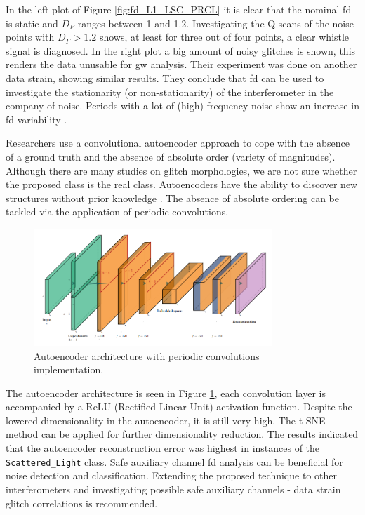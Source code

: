 In the left plot of Figure \ref{fig:fd_L1_LSC_PRCL} it is clear that the nominal \acrshort{fd} is static and $D_{F}$ ranges between 1 and 1.2. Investigating the Q-scans of the noise points with $D_{F} > 1.2$ shows, at least for three out of four points, a clear whistle signal is diagnosed. In the right plot a big amount of noisy glitches is shown, this renders the data unusable for \acrshort{gw} analysis. Their experiment was done on another data strain, showing similar results. They conclude that \acrshort{fd} can be used to investigate the stationarity (or non-stationarity) of the interferometer in the company of noise.  Periods with a lot of (high) frequency noise show an increase in \acrshort{fd} variability \citep{cavaglia2022characterization}.

Researchers \citep{laguarta2023detection} use a convolutional autoencoder approach to cope with the absence of a ground truth and the absence of absolute order (variety of magnitudes). Although there are many studies on glitch morphologies, we are not sure whether the proposed class is the real class. Autoencoders have the ability to discover new structures without prior knowledge \citep{bank2023autoencoders}. The absence of absolute ordering can be tackled via the application of periodic convolutions. 
\begin{figure}
    \centering
    \includegraphics[width=0.8\textwidth]{Images/autoencoder_periodic_convolution.png}
    \caption{Autoencoder architecture with periodic convolutions implementation. \citep{laguarta2023detection}}
    \label{fig:autoencoder_laguarta}
\end{figure}
The autoencoder architecture is seen in Figure \ref{fig:autoencoder_laguarta}, each convolution layer is accompanied by a ReLU (Rectified Linear Unit) activation function. Despite the lowered dimensionality in the autoencoder, it is still very high. The t-SNE method can be applied for further dimensionality reduction. 
The results indicated that the autoencoder reconstruction error was highest in instances of the \verb|Scattered_Light| class. 
Safe auxiliary channel \acrshort{fd} analysis can be beneficial for noise detection and classification. Extending the proposed technique to other interferometers and investigating possible safe auxiliary channels - data strain glitch correlations is recommended.

